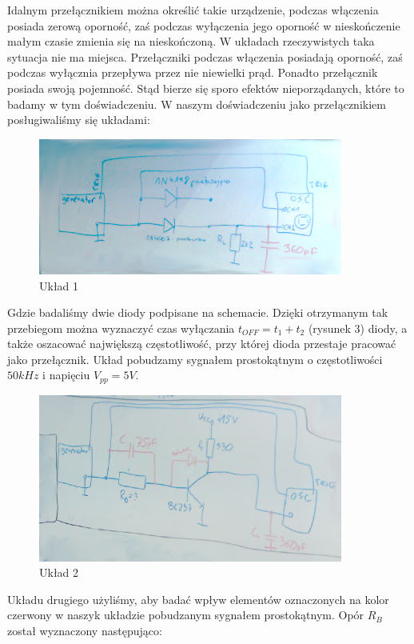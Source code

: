\documentclass[a4paper,11pt]{article}
\begin{document}
Idalnym przełącznikiem można określić takie urządzenie, podczas włączenia posiada zerową oporność, zaś podczas wyłączenia jego oporność w nieskończenie małym czasie zmienia się na nieskończoną. W układach rzeczywistych taka sytuacja nie ma miejsca. Przełączniki podczas włączenia posiadają oporność, zaś podczas wyłącznia przepływa przez nie niewielki prąd. Ponadto przełącznik posiada swoją pojemność. Stąd bierze się sporo efektów nieporządanych, które to badamy w tym doświadczeniu. W naszym doświadczeniu jako przełącznikiem posługiwaliśmy się układami: 
\begin{figure} [H]
  \begin{center}
    \includegraphics[width = 10cm]{../Obrazki_i_tekst/obrobione/u1.png}
    \caption{Układ 1}
  \end{center}
\end{figure}
Gdzie badaliśmy dwie diody podpisane na schemacie. Dzięki otrzymanym tak przebiegom można wyznaczyć czas wyłączania 
 $ t_{OFF} = t_1 + t_2 $ (rysunek 3) diody, a także oszacować największą częstotliwość, przy której dioda przestaje pracować jako przełącznik.  Układ pobudzamy sygnałem prostokątnym o częstotliwości $50 kHz$ i napięciu $V_{pp}=	5 V$.



\begin{figure} [H]
  \begin{center}
    \includegraphics[width = 10cm]{../Obrazki_i_tekst/obrobione/u2.png}
    \caption{Układ 2}
  \end{center}
\end{figure}
Układu drugiego użyliśmy, aby badać wpływ elementów oznaczonych na kolor czerwony w naszyk układzie pobudzanym sygnałem prostokątnym. Opór $R_B$ został wyznaczony następująco: 
\end{document}
